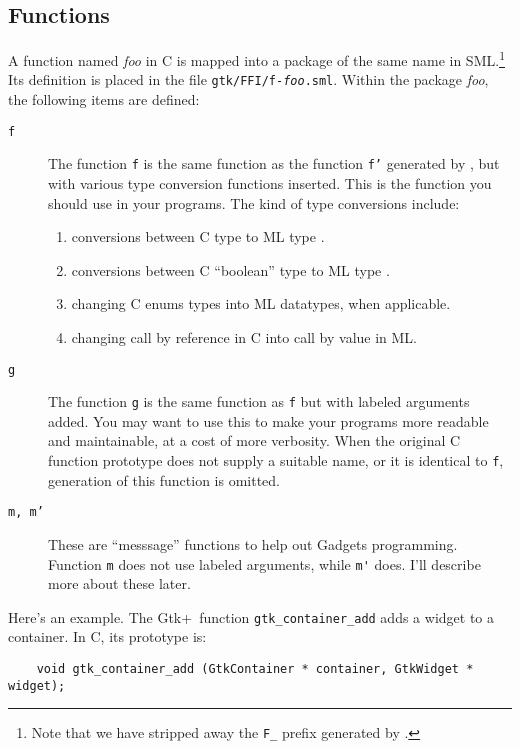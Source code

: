 \documentclass{article}
\newcommand{\gtk}{\mbox{\sf Gtk+}}
\begin{document}
\subsection{Functions}

   A function named {\em foo} in C is mapped into a package of the same name 
in SML.\footnote{Note that we have stripped away the {\tt F\_} prefix
generated by \mlnlffigen.}  
Its definition is placed in the file {\tt gtk/FFI/f-{\em foo}.sml}.
Within the package {\em foo}, the following items are defined:
   \begin{description} 
    \item[\tt f] The function {\tt f} is the same function as 
         the function {\tt f'} generated by \mlnlffigen, but
         with various type conversion functions inserted.  This is 
         the function you should use in your programs.
         The kind of type conversions include:
        \begin{enumerate}
          \item conversions between C type  to 
                ML type .
          \item conversions between C ``boolean'' type to ML type .
          \item changing C enums types into ML datatypes, when applicable.
          \item changing call by reference in C into call by value in ML.
         \end{enumerate}
    \item[\tt g] The function {\tt g} is the same function as {\tt f}
         but with labeled arguments added.  You may want to use this
         to make your programs more readable and maintainable, at a cost
         of more verbosity.
         When the original C function prototype does not supply a suitable name,
         or it is identical to {\tt f}, generation of this function is omitted.
    \item[\tt m, m'] These are ``messsage'' functions to help
out Gadgets programming.  Function \verb|m| does not use labeled arguments,
while \verb|m'| does.  I'll describe more about these later.
  \end{description}

   Here's an example.  The \gtk\ function \verb|gtk_container_add| adds
a widget to a container.  In C, its prototype is:
\begin{verbatim}
    void gtk_container_add (GtkContainer * container, GtkWidget * widget);
\end{verbatim}
\end{document}
